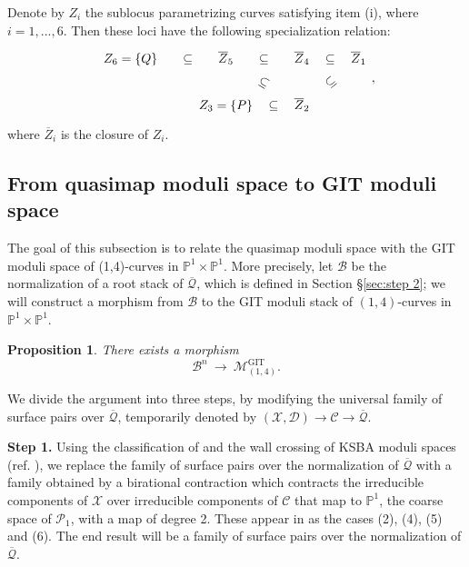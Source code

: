 \documentclass[a4paper,12pt]{amsart}
\newcommand{\ove}[1]{\overline{#1}}
\newcommand{\cQ}{\mathcal{Q}}
\DeclareMathOperator{\GIT}{GIT}
\newcommand{\bP}{{\mathbb P}}
\newcommand{\sP}{{\mathscr{P}}}
\newcommand{\sD}{{\mathscr{D}}}
\newcommand{\sX}{{\mathscr{X}}}
\newcommand{\sC}{{\mathscr{C}}}
\newcommand{\sB}{{\mathscr{B}}}
\newcommand\cM{{\mathcal{M}}}
\newtheorem{prop}[theorem]{Proposition}
\theoremstyle{definition}
\theoremstyle{remark}
\begin{document}
Denote by $Z_i$ the sublocus parametrizing curves satisfying item (i), where $i=1,...,6$. Then these loci have the following specialization relation:
\[\begin{tikzcd}
	{Z_6=\{Q\}} & {\ove{Z}_5} & {\ove{Z}_4} & {\ove{Z}_1} \\
	& {Z_3=\{P\}} & {\ove{Z}_2}
	\arrow["\subseteq"{marking, allow upside down}, draw=none, from=1-1, to=1-2]
	\arrow["\subseteq"{marking, allow upside down}, draw=none, from=1-2, to=1-3]
	\arrow["\subseteq"{marking, allow upside down}, draw=none, from=1-2, to=2-3]
	\arrow["\subseteq"{marking, allow upside down}, draw=none, from=1-3, to=1-4]
	\arrow["\subseteq"{marking, allow upside down}, draw=none, from=2-2, to=2-3]
	\arrow["\subseteq"{marking, allow upside down}, draw=none, from=2-3, to=1-4]
\end{tikzcd},\] where $\ove{Z}_i$ is the closure of $Z_i$.


\subsection{From quasimap moduli space to GIT moduli space}
The goal of this subsection is to relate the quasimap moduli space with the GIT moduli space of (1,4)-curves in $\bP^1\times \bP^1$. More precisely, let $\sB$ be the normalization of a root stack of $\overline{\cQ}$, which is defined in Section \S \ref{sec:step 2}; we will construct a morphism from $\sB$ to the GIT moduli stack of $(1,4)$-curves in $\bP^1\times \bP^1$. 

\begin{prop}\label{prop:existence of a morphism}
   There exists a morphism $$\sB^n\ \longrightarrow \  \cM^{\GIT}_{(1,4)}.$$
\end{prop}

\noindent We divide the argument into three steps, by modifying the universal family of surface pairs over $\ove{\cQ}$, temporarily denoted by $(\sX,\sD)\to \sC\to \overline{\cQ}$.

\textbf{Step 1.} Using the classification of  and the wall crossing of KSBA moduli spaces (ref. \cite{ascher2023wall,meng2023mmp}), we replace the family of surface pairs over the normalization of $\overline{\cQ}$ with a family obtained by a birational contraction which contracts the irreducible components of $\sX$ over irreducible components of $\sC$ that map to $\bP^1$, the coarse space of $\sP_1$, with a map of degree 2. These appear in  as the cases (2), (4), (5) and (6). The end result will be a family of surface pairs over the normalization of $\overline{\cQ}$.
\end{document}
